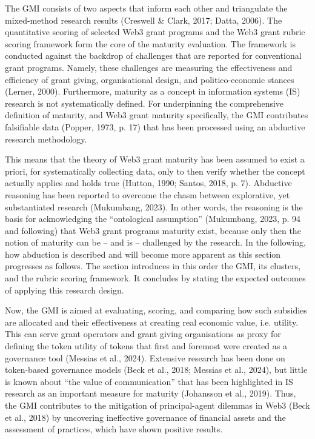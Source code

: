 \documentclass[conference]{IEEEtran}
\begin{document}
The GMI consists of two aspects that inform each other and triangulate the mixed-method research results (Creswell \& Clark, 2017; Datta, 2006). The quantitative scoring of selected Web3 grant programs and the Web3 grant rubric scoring framework form the core of the maturity evaluation. The framework is conducted against the backdrop of challenges that are reported for conventional grant programs. Namely, these challenges are measuring the effectiveness and efficiency of grant giving, organisational design, and politico-economic stances (Lerner, 2000). Furthermore, maturity as a concept in information systems (IS) research is not systematically defined. For underpinning the comprehensive definition of maturity, and Web3 grant maturity specifically, the GMI contributes falsifiable data (Popper, 1973, p. 17)  that has been processed using an abductive research methodology.

This means that the theory of Web3 grant maturity has been assumed to exist a priori, for systematically collecting data, only to then verify whether the concept actually applies and holds true (Hutton, 1990; Santos, 2018, p. 7). Abductive reasoning has been reported to overcome the chasm between explorative, yet substantiated research (Mukumbang, 2023). In other words, the reasoning is the basis for acknowledging the “ontological assumption” (Mukumbang, 2023, p. 94 and following) that Web3 grant programs maturity exist, because only then the notion of maturity can be – and is – challenged by the research.  In the following, how abduction is described and will become more apparent as this section progresses as follows. The section introduces in this order the GMI, its clusters, and the rubric scoring framework. It concludes by stating the expected outcomes of applying this research design.

Now, the GMI is aimed at evaluating, scoring, and comparing how such subsidies are allocated and their effectiveness at creating real economic value, i.e. utility. This can serve grant operators and grant giving organisations as proxy for defining the token utility of tokens that first and foremost were created as a governance tool (Messias et al., 2024). Extensive research has been done on token-based governance models (Beck et al., 2018; Messias et al., 2024), but little is known about “the value of communication” that has been highlighted in IS research as an important measure for maturity (Johansson et al., 2019). Thus, the GMI contributes to the mitigation of principal-agent dilemmas in Web3 (Beck et al., 2018) by uncovering ineffective governance of financial assets and the assessment of practices, which have shown positive results.
\end{document}
